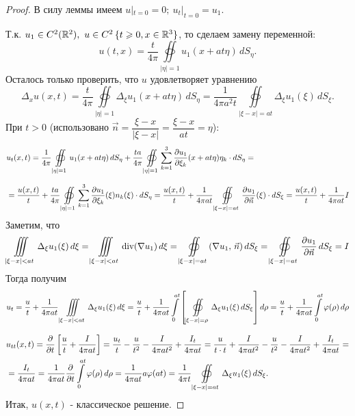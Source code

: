 \documentclass[../main.tex]{subfiles}
\begin{document}
\begin{proof}
В силу леммы имеем 
$u|_{t=0} = 0;\ u_t|_{t=0} = u_1$.

Т.к. $u_1 \in C^2(\mathbb{R}^2),\ u \in C^2\,\{t\geqslant 0, x\in\mathbb{R}^3\}$, то сделаем замену переменной:
\[
u(t,x) = \frac{t}{4\pi}
\oiint\limits_{|\eta|=1}  u_1(x+at\eta)\,  dS_{\eta}.
\]
Осталось только проверить, что $u$ удовлетворяет уравнению
\[
\Delta_x u(x,t) 
= \frac{t}{4\pi}
  \oiint\limits_{|\eta|=1}   \Delta_{\xi} u_1(x+at\eta)\,  dS_{\eta}
= \frac{1}{4\pi a^2t}
  \oiint\limits_{|\xi-x|=at}  \Delta_{\xi} u_1(\xi)\,  dS_{\xi}.
\]
При $t>0$ (использовано $\vec{n} 
     = \dfrac{\xi-x}{|\xi-x|} 
     = \dfrac{\xi-x}{at}   =  \eta$):
\begin{equation*}
\begin{split}
%
&u_t(x,t) = \frac{1}{4\pi}
\oiint\limits_{|\eta|=1}  u_1(x+at\eta)\,  dS_{\eta}
+\frac{ta}{4\pi}
\oiint\limits_{|\eta|=1}
      \sum\limits_{k=1}^3 
      \pd{u_1}{\xi_k} (x+at\eta) \eta_k 
      \cdot dS_{\eta} 
 = \\[0.75em]
%
&=\frac{u(x,t)}{t} + \frac{ta}{4\pi}
\oiint\limits_{|\eta|=1}
       \sum\limits_{k=1}^3 
       \pd{u_1}{\xi_k} (\xi)  n_k(\xi)
       \cdot dS_{\eta}
%
=\frac{u(x,t)}{t} + \frac{1}{4\pi at}
\oiint\limits_{|\xi-x|=at}
       \pd{u_1}{\vec{n}}(\xi) 
       \cdot dS_{\xi}
%
=\frac{u(x,t)}{t} + \frac{1}{4\pi at} I
%
\end{split}
\end{equation*}
Заметим, что
\[
 \iiint\limits_{|\xi-x|<at}  \Delta_{\xi}  u_1(\xi)\,   d\xi 
=\iiint\limits_{|\xi-x|<at}    \operatorname{div}  (\nabla u_1)\,     d\xi 
=\oiint\limits_{|\xi-x|=at}  (\nabla u_1,\, \vec{n})\,  dS_{\xi }
=\oiint\limits_{|\xi-x|=at}     \dfrac{\partial u_1}{\partial \vec{n}}\,     dS_{\xi }=I
\]
Тогда получим 
$$
u_t = \frac{u}{t} + \frac{1}{4\pi at}
 \iiint\limits_{|\xi-x|<at}  \Delta_{\xi}  u_1(\xi)\,   d\xi \\
%
=\frac{u}{t} + \frac{1}{4\pi at}
\int\limits_0^{at} 
  \left[
    \oiint\limits_{|\xi-x|=\rho}  \Delta_{\xi} u_1(\xi)\,  dS_{\xi}
  \right] d\rho \\
%
=\frac{u}{t} + \frac{1}{4\pi at}
\int\limits_0^{at}  \phi(\rho)\,  d\rho
$$

\begin{equation*}
\begin{split}
&u_{tt}(x,t) = \pd{}{t}
  \left[
    \frac{u}{t} + \frac{I}{4\pi at} 
  \right]
= \frac{u_t}{t} - \frac{u}{t^2}
  - \frac{I}{4\pi at^2} + \frac{I_t}{4\pi at} 
= \frac{u}{t \cdot t} + \frac{I}{4\pi at^2}
  - \frac{u}{t^2} - \frac{I}{4\pi at^2} 
  + \frac{I_t}{4\pi at} = \\
%
&=\frac{I_t}{4\pi at} 
= \frac{1}{4\pi at} \pd{}{t}
  \int\limits_0^{at}  \phi(\rho)\,  d\rho 
= \frac{1}{4\pi at} a \phi(at)
= \frac{1}{4\pi t}
  \oiint\limits_{|\xi-x|=at}  \Delta_{\xi}  u_1(\xi)\,  dS_{\xi}.
\end{split}
\end{equation*}
%
Итак, $u(x, t)$ - классическое решение.
\end{proof}
\end{document}
